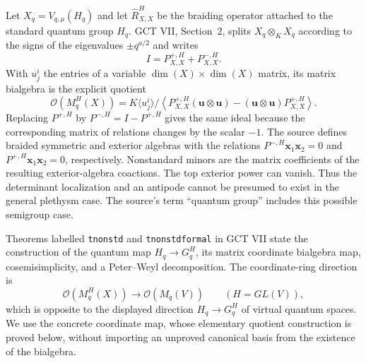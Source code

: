 Let $X_q=V_{q,\mu}(H_q)$ and let $\widehat R_{X,X}^{H}$ be the braiding
operator attached to the standard quantum group $H_q$.  GCT VII,
Section~2, splits $X_q\otimes_K X_q$ according to the signs of the
eigenvalues $\pm q^{a/2}$ and writes
\[
 I=P_{X,X}^{+,H}+P_{X,X}^{-,H}.
\]
With $u^i_j$ the entries of a variable $\dim(X)\times\dim(X)$ matrix,
its matrix bialgebra is the explicit quotient
\begin{equation}\label{eq:gct-nrh-frt-source}
 \mathcal O(M_q^H(X))
 =K\langle u^i_j\rangle\Big/
 \left\langle
 P_{X,X}^{+,H}(\mathbf u\otimes\mathbf u)
       -(\mathbf u\otimes\mathbf u)P_{X,X}^{+,H}
 \right\rangle.
\end{equation}
Replacing $P^{+,H}$ by $P^{-,H}=I-P^{+,H}$ gives the same ideal because
the corresponding matrix of relations changes by the scalar $-1$.
The source defines braided symmetric and exterior algebras with the
relations $P^{-,H}\mathbf x_1\mathbf x_2=0$ and
$P^{+,H}\mathbf x_1\mathbf x_2=0$, respectively.  Nonstandard minors
are the matrix coefficients of the resulting exterior-algebra coactions.
The top exterior power can vanish.  Thus the determinant localization
and an antipode cannot be presumed to exist in the general plethysm case.
The source's term ``quantum group'' includes this possible semigroup case.

Theorems labelled \texttt{tnonstd} and \texttt{tnonstdformal} in GCT VII
state the construction of the quantum map $H_q\to G_q^H$, its matrix
coordinate bialgebra map, cosemisimplicity, and a Peter--Weyl decomposition.
The coordinate-ring direction is
\[
 \mathcal O(M_q^H(X))\longrightarrow\mathcal O(M_q(V))
 \qquad(H=GL(V)),
\]
which is opposite to the displayed direction $H_q\to G_q^H$ of virtual
quantum spaces.  We use the concrete coordinate map, whose elementary
quotient construction is proved below, without importing an unproved
canonical basis from the existence of the bialgebra.

